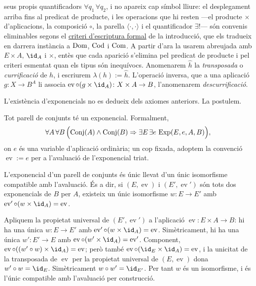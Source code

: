 \begin{notacio}
seus propis quantificadors \(\forall q_1\,\forall q_2\), i no apareix cap
símbol lliure: el desplegament arriba fins al predicat de producte, i les
operacions que hi resten ---el producte \(\times\) d'aplicacions, la
composició \(\circ\), la parella \(\langle\cdot,\cdot\rangle\) i el
quantificador \(\exists!\)--- són convenis eliminables segons el
\hyperref[not:criteri-formal]{criteri d'escriptura formal} de la
introducció, que els tradueix en darrera instància a \(\operatorname{Dom}\), \(\operatorname{Cod}\) i
\(\operatorname{Com}\). A partir d'ara la usarem abreujada amb \(E\times A\), \(\id_A\) i
\(\times\), entès que cada aparició s'elimina pel predicat de producte i
pel criteri esmentat quan els tipus són inequívocs.
Anomenarem \(\widehat h\) la \emph{transposada} o \emph{currificació} de
\(h\), i escriurem \(\lambda(h):=\widehat h\). L'operació inversa, que a
una aplicació \(g\colon X\to B^A\) li associa
\(\operatorname{ev}\circ(g\times\id_A)\colon X\times A\to B\), l'anomenarem
\emph{descurrificació}.
\end{notacio}

L'existència d'exponencials no es dedueix dels axiomes anteriors. La
postulem.

\begin{axioma}\label{ax:exponencials}
Tot parell de conjunts té un exponencial. Formalment,
\[
\forall A\,\forall B\,
\Bigl(
\operatorname{Conj}(A)\land\operatorname{Conj}(B)
\Rightarrow
\exists E\,\exists e\,
\operatorname{Exp}(E,e,A,B)
\Bigr),
\]
on \(e\) és una variable d'aplicació ordinària; un cop fixada, adoptem la
convenció \(\operatorname{ev}:=e\) per a l'avaluació de l'exponencial
triat.
\end{axioma}

\begin{proposicio}\label{prop:exponencial-unic}
L'exponencial d'un parell de conjunts és únic llevat d'un únic
isomorfisme compatible amb l'avaluació. És a dir, si \((E,\operatorname{ev})\)
i \((E',\operatorname{ev}')\) són tots dos exponencials de \(B\) per \(A\),
existeix un únic isomorfisme \(w\colon E\to E'\) amb
\(\operatorname{ev}'\circ(w\times\id_A)=\operatorname{ev}\).
\end{proposicio}

\begin{prova}
Apliquem la propietat universal de \((E',\operatorname{ev}')\) a
l'aplicació \(\operatorname{ev}\colon E\times A\to B\): hi ha una única
\(w\colon E\to E'\) amb \(\operatorname{ev}'\circ(w\times\id_A)=\operatorname{ev}\).
Simètricament, hi ha una única \(w'\colon E'\to E\) amb
\(\operatorname{ev}\circ(w'\times\id_A)=\operatorname{ev}'\). Component,
\(\operatorname{ev}\circ((w'\circ w)\times\id_A)=\operatorname{ev}\); però
també \(\operatorname{ev}\circ(\id_E\times\id_A)=\operatorname{ev}\), i la
unicitat de la transposada de \(\operatorname{ev}\) per la propietat
universal de \((E,\operatorname{ev})\) dona \(w'\circ w=\id_E\).
Simètricament \(w\circ w'=\id_{E'}\). Per tant \(w\) és un isomorfisme, i
és l'únic compatible amb l'avaluació per construcció.
\end{prova}

